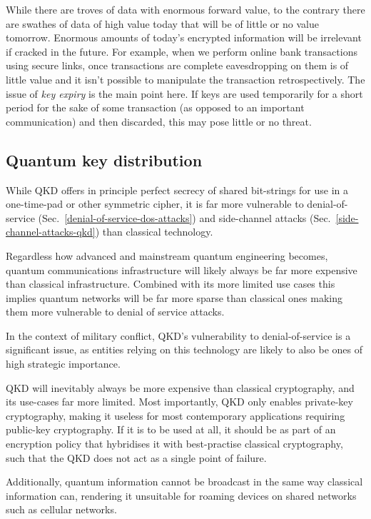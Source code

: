 While there are troves of data with enormous forward value, to the contrary there are swathes of data of high value today that will be of little or no value tomorrow. Enormous amounts of today's encrypted information will be irrelevant if cracked in the future. For example, when we perform online bank transactions using secure links, once transactions are complete eavesdropping on them is of little value and it isn't possible to manipulate the transaction retrospectively. The issue of \emph{key expiry} is the main point here. If keys are used temporarily for a short period for the sake of some transaction (as opposed to an important communication) and then discarded, this may pose little or no threat.

\subsection{Quantum key distribution}

While QKD offers in principle perfect secrecy of shared bit-strings for use in a one-time-pad or other symmetric cipher, it is far more vulnerable to denial-of-service (Sec.~\ref{denial-of-service-dos-attacks}) and side-channel attacks (Sec.~\ref{side-channel-attacks-qkd}) than classical technology.

Regardless how advanced and mainstream quantum engineering becomes, quantum communications infrastructure will likely always be far more expensive than classical infrastructure. Combined with its more limited use cases this implies quantum networks will be far more sparse than classical ones making them more vulnerable to denial of service attacks.

In the context of military conflict, QKD's vulnerability to denial-of-service is a significant issue, as entities relying on this technology are likely to also be ones of high strategic importance.

QKD will inevitably always be more expensive than classical cryptography, and its use-cases far more limited. Most importantly, QKD only enables private-key cryptography, making it useless for most contemporary applications requiring public-key cryptography. If it is to be used at all, it should be as part of an encryption policy that hybridises it with best-practise classical cryptography, such that the QKD does not act as a single point of failure.

Additionally, quantum information cannot be broadcast in the same way classical information can, rendering it unsuitable for roaming devices on shared networks such as cellular networks.


